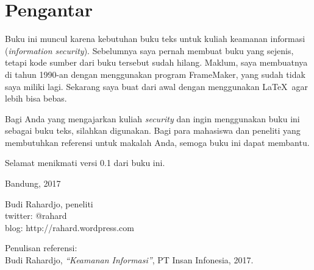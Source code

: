 \chapter{Pengantar}

Buku ini muncul karena kebutuhan buku teks untuk kuliah
keamanan informasi ({\em information security}).
Sebelumnya saya pernah membuat buku yang sejenis, tetapi kode sumber
dari buku tersebut sudah hilang.
Maklum, saya membuatnya di tahun 1990-an dengan menggunakan program
FrameMaker, yang sudah tidak saya miliki lagi.
Sekarang saya buat dari awal dengan menggunakan \LaTeX \ agar
lebih bisa bebas.

Bagi Anda yang mengajarkan kuliah {\em security} dan ingin menggunakan
buku ini sebagai buku teks, silahkan digunakan.
Bagi para mahasiswa dan peneliti yang membutuhkan referensi untuk
makalah Anda, semoga buku ini dapat membantu.

Selamat menikmati versi 0.1 dari buku ini.
\vspace{5 mm}

Bandung, 2017


Budi Rahardjo, peneliti\\
twitter: @rahard\\
blog: http://rahard.wordpress.com

\vspace{5 mm}
Penulisan referensi:\\
Budi Rahardjo, {\em ``Keamanan Informasi''}, PT Insan Infonesia, 2017.
